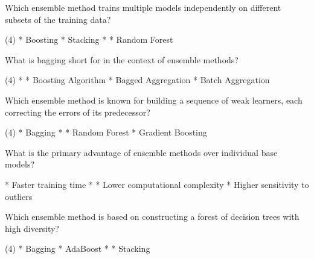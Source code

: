 \documentclass[10pt]{extarticle}
\begin{document}
\begin{exercise}
    Which ensemble method trains multiple models independently on different subsets of the training data?
    \begin{choice}(4)
        * Boosting
        * Stacking
        * 
        * Random Forest
    \end{choice}
\end{exercise}
\begin{solution}
\end{solution}

\begin{exercise}
    What is bagging short for in the context of ensemble methods?

    \begin{choice}(4)
        * 
        * Boosting Algorithm
        * Bagged Aggregation
        * Batch Aggregation
    \end{choice}
\end{exercise}
\begin{solution}
\end{solution}

\begin{exercise}
    Which ensemble method is known for building a sequence of weak learners, each correcting the errors of its predecessor?
    \begin{choice} (4)
        * Bagging
        * 
        * Random Forest
        * Gradient Boosting
    \end{choice}
\end{exercise}
\begin{solution}
\end{solution}

\begin{exercise}
    What is the primary advantage of ensemble methods over individual base models?
    \begin{choice}
        * Faster training time
        * 
        * Lower computational complexity
        * Higher sensitivity to outliers
    \end{choice}
\end{exercise}
\begin{solution}
\end{solution}

\begin{exercise}
    Which ensemble method is based on constructing a forest of decision trees with high diversity?
    \begin{choice}(4)
        * Bagging
        * AdaBoost
        * 
        * Stacking
    \end{choice}
\end{exercise}
\begin{solution}
\end{solution}
\end{document}

